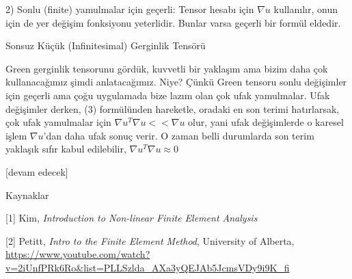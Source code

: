 \documentclass[12pt,fleqn]{article}\usepackage{../../common}
\begin{document}
2) Sonlu (finite) yamulmalar için geçerli: Tensor hesabı için $\nabla u$
kullanılır, onun için de yer değişim fonksiyonu yeterlidir. Bunlar varsa
geçerli bir formül eldedir. 

Sonsuz Küçük (Infinitesimal) Gerginlik Tensörü

Green gerginlik tensorunu gördük, kuvvetli bir yaklaşım ama bizim daha çok
kullanacağımız şimdi anlatacağımız. Niye? Çünkü Green tensoru sonlu değişimler
için geçerli ama çoğu uygulamada bize lazım olan çok ufak yamulmalar. Ufak
değişimler derken, (3) formülünden hareketle, oradaki en son terimi hatırlarsak,
çok ufak yamulmalar için $\nabla u^T \nabla u << \nabla u$ olur, yani ufak
değişimlerde o karesel işlem $\nabla u$'dan daha ufak sonuç verir. O zaman belli
durumlarda son terim yaklaşık sıfır kabul edilebilir, $\nabla u^T \nabla u
\approx 0$

[devam edecek]

Kaynaklar

[1] Kim, {\em Introduction to Non-linear Finite Element Analysis}

[2] Petitt, {\em Intro to the Finite Element Method}, University of Alberta,
    \url{https://www.youtube.com/watch?v=2iUnfPRk6Ro&list=PLLSzlda_AXa3yQEJAb5JcmsVDy9i9K_fi}
\end{document}
